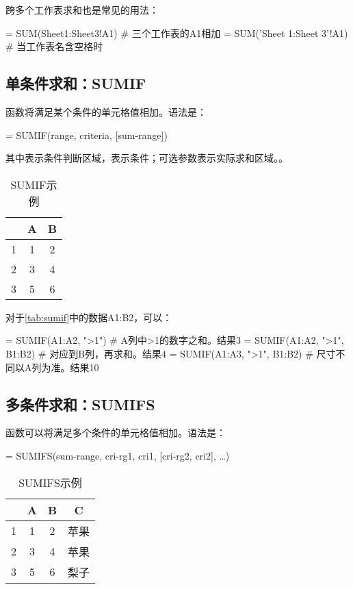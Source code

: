 跨多个工作表求和也是常见的用法：
\begin{excode}
= SUM(Sheet1:Sheet3!A1)  # 三个工作表的A1相加
= SUM('Sheet 1:Sheet 3'!A1)  # 当工作表名含空格时
\end{excode}

\subsection{单条件求和：SUMIF}
函数将满足某个条件的单元格值相加。语法是：
\begin{syntax}
= SUMIF(range, criteria, [sum-range])
\end{syntax}

其中表示条件判断区域，表示条件；可选参数表示实际求和区域。。

\begin{table}[!hbt]
    \centering
    \caption{SUMIF示例}\label{tab:sumif}
    \begin{tabular}{c|cc}
    \hline
      & A & B \\
    \hline
    1 & 1 & 2 \\
    2 & 3 & 4 \\
    3 & 5 & 6 \\
    \hline
    \end{tabular}
\end{table}

对于\autoref{tab:sumif}中的数据A1:B2，可以：
\begin{excode}
= SUMIF(A1:A2, ">1")  # A列中>1的数字之和。结果3
= SUMIF(A1:A2, ">1", B1:B2)  # 对应到B列，再求和。结果4
= SUMIF(A1:A3, ">1", B1:B2)  # 尺寸不同以A列为准。结果10
\end{excode}

\subsection{多条件求和：SUMIFS}
函数可以将满足多个条件的单元格值相加。语法是：
\begin{syntax}
= SUMIFS(sum-range, cri-rg1, cri1, [cri-rg2, cri2], \ldots)
\end{syntax}

\begin{table}[!hbt]
    \centering
    \caption{SUMIFS示例}\label{tab:sumifs}
    \begin{tabular}{c|ccc}
    \hline
      & A & B & C \\
    \hline
    1 & 1 & 2 & 苹果\\
    2 & 3 & 4 & 苹果\\
    3 & 5 & 6 & 梨子\\
    \hline
    \end{tabular}
\end{table}


